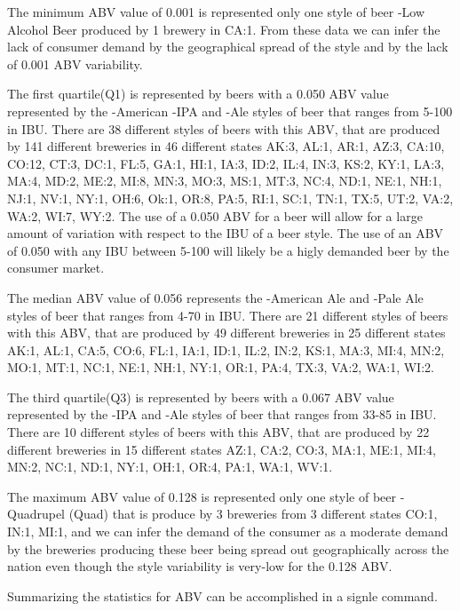 \documentclass[]{article}
\begin{document}
The minimum ABV value of 0.001 is represented only one style of beer
-Low Alcohol Beer produced by 1 brewery in CA:1. From these data we can
infer the lack of consumer demand by the geographical spread of the
style and by the lack of 0.001 ABV variability.

The first quartile(Q1) is represented by beers with a 0.050 ABV value
represented by the -American -IPA and -Ale styles of beer that ranges
from 5-100 in IBU. There are 38 different styles of beers with this ABV,
that are produced by 141 different breweries in 46 different states
AK:3, AL:1, AR:1, AZ:3, CA:10, CO:12, CT:3, DC:1, FL:5, GA:1, HI:1,
IA:3, ID:2, IL:4, IN:3, KS:2, KY:1, LA:3, MA:4, MD:2, ME:2, MI:8, MN:3,
MO:3, MS:1, MT:3, NC:4, ND:1, NE:1, NH:1, NJ:1, NV:1, NY:1, OH:6, Ok:1,
OR:8, PA:5, RI:1, SC:1, TN:1, TX:5, UT:2, VA:2, WA:2, WI:7, WY:2. The
use of a 0.050 ABV for a beer will allow for a large amount of variation
with respect to the IBU of a beer style. The use of an ABV of 0.050 with
any IBU between 5-100 will likely be a higly demanded beer by the
consumer market.

The median ABV value of 0.056 represents the -American Ale and -Pale Ale
styles of beer that ranges from 4-70 in IBU. There are 21 different
styles of beers with this ABV, that are produced by 49 different
breweries in 25 different states AK:1, AL:1, CA:5, CO:6, FL:1, IA:1,
ID:1, IL:2, IN:2, KS:1, MA:3, MI:4, MN:2, MO:1, MT:1, NC:1, NE:1, NH:1,
NY:1, OR:1, PA:4, TX:3, VA:2, WA:1, WI:2.

The third quartile(Q3) is represented by beers with a 0.067 ABV value
represented by the -IPA and -Ale styles of beer that ranges from 33-85
in IBU. There are 10 different styles of beers with this ABV, that are
produced by 22 different breweries in 15 different states AZ:1, CA:2,
CO:3, MA:1, ME:1, MI:4, MN:2, NC:1, ND:1, NY:1, OH:1, OR:4, PA:1, WA:1,
WV:1.

The maximum ABV value of 0.128 is represented only one style of beer
-Quadrupel (Quad) that is produce by 3 breweries from 3 different states
CO:1, IN:1, MI:1, and we can infer the demand of the consumer as a
moderate demand by the breweries producing these beer being spread out
geographically across the nation even though the style variability is
very-low for the 0.128 ABV.

Summarizing the statistics for ABV can be accomplished in a signle
command.
\end{document}
